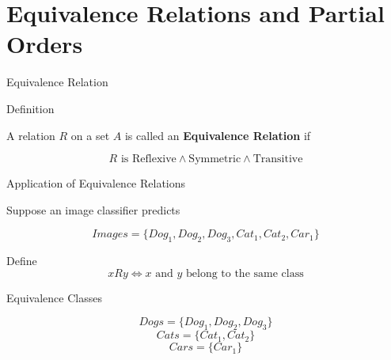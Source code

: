 \section{Equivalence Relations and Partial Orders}

\begin{frame}{Equivalence Relation}

\begin{block}{Definition}

\vspace{0.1cm}

A relation $R$ on a set $A$ is called an \textbf{Equivalence Relation} if

\[
R
\text{ is }
\boxed{\text{Reflexive}}
\land
\boxed{\text{Symmetric}}
\land
\boxed{\text{Transitive}}
\]

\end{block}

\end{frame}


\begin{frame}{Application of Equivalence Relations}

Suppose an image classifier predicts

\[
Images=
\{
Dog_1,
Dog_2,
Dog_3,
Cat_1,
Cat_2,
Car_1
\}
\]

Define
\[
xRy
\iff
\text{$x$ and $y$ belong to the same class}
\]

Equivalence Classes

\[
Dogs=
\{Dog_1,Dog_2,Dog_3\}
\]
\[
Cats=
\{Cat_1,Cat_2\}
\]
\[
Cars=
\{Car_1\}
\]

\end{frame}

